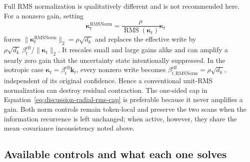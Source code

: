\documentclass[11pt]{article}
\newcommand{\vct}[1]{\boldsymbol{#1}}
\begin{document}
Full RMS normalization is qualitatively different and is not recommended here. For a nonzero
gain, setting
\begin{equation}
  \vct{\kappa}_t^{\mathrm{RMSNorm}}
    =\frac{\rho}{\operatorname{RMS}(\vct{\kappa}_t)}\vct{\kappa}_t
  \label{eq:discussion-full-rms-normalization}
\end{equation}
forces $\|\vct{\kappa}_t^{\mathrm{RMSNorm}}\|_2=\rho\sqrt{d_k}$ and replaces the effective
write by
$\rho\sqrt{d_k}\,\beta_t^{\mathrm{eff}}/\|\vct{\kappa}_t\|_2$. It rescales small and large
gains alike and can amplify a nearly zero gain that the uncertainty state intentionally
suppressed. In the isotropic case
$\vct{\kappa}_t=\beta_t^{\mathrm{eff}}\vct{k}_t$, every nonzero write becomes
$\beta_{t,\mathrm{RMSNorm}}^{\mathrm{eff}}=\rho\sqrt{d_k}$, independent of its original
confidence. Hence a conventional unit-RMS normalization can destroy residual contraction. The
one-sided cap in Equation~\eqref{eq:discussion-radial-rms-cap} is preferable because it never
amplifies a gain. Both norm controls remain token-local and preserve the two scans when the
information recurrence is left unchanged; when active, however, they share the mean--covariance
inconsistency noted above.

\subsection{Available controls and what each one solves}
\end{document}
